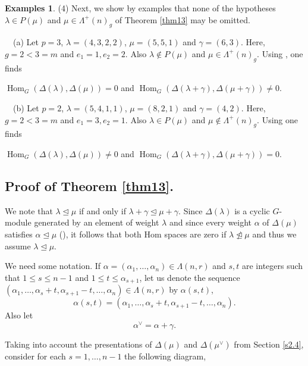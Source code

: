 \documentclass[11pt]{article}
\theoremstyle{definition}
\newtheorem{exams}[theo]{Examples}
\numberwithin{equation}{section}
\newcommand{\al}{\alpha}
\newcommand{\la}{\lambda}
\newcommand{\La}{\Lambda}
\DeclareMathOperator{\Hom}{Hom}
\numberwithin{equation}{section}
\begin{document}
\begin{exams}
		(4) Next, we show by examples that none of the hypotheses $\la \in P(\mu)$ and $ \mu \in \La^{+}(n)_g$ of Theorem \ref{thm13} may be omitted.
		
		\ \ (a) Let $p=3$, $\la=(4,3,2,2)$, $\mu=(5,5,1)$ and $\gamma=(6, 3)$. Here, $g=2<3=m$ and $e_1=1, e_2=2$. Also $\la \notin P(\mu)$ and $\mu \in \La^{+}(n)_g$. Using \cite{FGAP}, one finds  \begin{center}
			$\Hom_G(\Delta(\la),\Delta(\mu))=0$ and $\Hom_{G}(\Delta(\la+\gamma), \Delta(\mu+\gamma)) \neq 0$.
		\end{center}
		
		\ \ (b) Let $p=2$, $\lambda = (5,4,1,1)$, $\mu=(8,2,1)$ and $\gamma = (4,2)$. Here, $g=2<3=m$ and $e_1=3, e_2=1$. Also $\la \in P(\mu)$ and $\mu \notin \La^{+}(n)_g$. Using \cite{FGAP} one finds \begin{center}
			$\Hom_G(\Delta(\la),\Delta(\mu)) \neq 0$ and $\Hom_{G}(\Delta(\la+\gamma), \Delta(\mu+\gamma)) = 0$.
		\end{center}
	\end{exams}

	\subsection{Proof of Theorem \ref{thm13}.} \label{s4.2} We note that $\lambda \unlhd \mu$ if and only if $\lambda +\gamma \unlhd \mu + \gamma$. Since $\Delta{(\lambda)}$ is a cyclic $G$-module generated by an element of weight $\lambda$ and since every weight $\alpha$ of $\Delta(\mu)$ satisfies $\alpha \unlhd \mu$ (\cite[II 2.2 Prop]{Jan}), it follows that both Hom spaces are zero if $\lambda \ntrianglelefteq \mu$ and thus we assume $\lambda \unlhd \mu$.

We need some notation. If $\al=(\al_1,\dots,\al_n) \in \La(n,r)$ and $s, t$ are integers such that $1 \le s \le n-1$ and $1 \le t \le \al_{s+1} $, let us denote the sequence $(\al_1,\dots,\al_s+t, \al_{s+1}-t,\dots,\al_n) \in \La(n,r)$ by $\al({s,t})$, \[\al({s,t}) = (\al_1,\dots,\al_s+t, \al_{s+1}-t,\dots,\al_n). \] Also let \[\al^{\vee} =\al+\gamma.\]

Taking into account the presentations of $\Delta(\mu)$ and $\Delta(\mu ^{\vee})$ from Section \ref{s2.4}, consider for each $s=1,\dots,n-1$ the following diagram,
\end{document}
